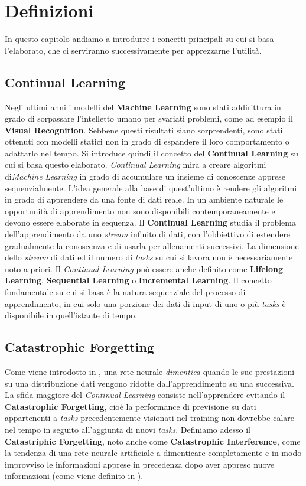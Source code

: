 \chapter{Definizioni}\label{ch:chapter1}
In questo capitolo andiamo a introdurre i concetti principali su cui si basa l'elaborato, che ci serviranno successivamente per apprezzarne l'utilità. 
\section{Continual Learning}
Negli ultimi anni i modelli del \textbf{Machine Learning} sono stati addirittura in grado di sorpassare l'intelletto umano per svariati problemi, come ad esempio il \textbf{Visual Recognition}.
Sebbene questi risultati siano sorprendenti, sono stati ottenuti con modelli statici non in grado di espandere il loro comportamento o adattarlo nel tempo. Si introduce quindi il concetto del \textbf{Continual Learning} su cui si basa questo elaborato.\newline
\textit{Continual Learning} mira a creare algoritmi di\textit{Machine Learning} in grado di accumulare un insieme di conoscenze apprese sequenzialmente. L'idea generale alla base di quest'ultimo è rendere gli algoritmi in grado di apprendere da una fonte di dati reale. In un ambiente naturale le opportunità di apprendimento non sono disponibili contemporaneamente e devono essere elaborate in sequenza.\newline
Il \textbf{Continual Learning} studia il problema dell'apprendimento da uno \textit{stream} infinito di dati, con l'obbiettivo di estendere gradualmente la conoscenza e di usarla per allenamenti successivi. La dimensione dello \textit{stream} di dati ed il numero di \textit{tasks} su cui si lavora non è necessariamente noto a priori.  Il \textit{Continual Learning} può essere anche definito come \textbf{Lifelong Learning}, \textbf{Sequential Learning} o \textbf{Incremental Learning}.
Il concetto fondamentale su cui si basa  è la natura sequenziale del processo di apprendimento, in cui solo una porzione dei dati di input di uno o più \textit{tasks} è disponibile in quell'istante di tempo.
\section{Catastrophic Forgetting}
Come viene introdotto in \cite{Continual_Learning}, una rete neurale \textit{dimentica} quando le sue prestazioni su una distribuzione dati vengono ridotte dall'apprendimento su una successiva.
La sfida maggiore del \textit{Continual Learning} consiste nell'apprendere evitando il  \textbf{Catastrophic Forgetting}, cioè la performance di previsione su dati appartenenti a \textit{tasks} precedentemente visionati nel training non dovrebbe calare nel tempo in seguito all'aggiunta di nuovi \textit{tasks}.
Definiamo adesso il \textbf{Catastriphic Forgetting}, noto anche come \textbf{Catastrophic Interference}, come la tendenza di una rete neurale artificiale a dimenticare completamente e in modo improvviso le informazioni apprese in precedenza dopo aver appreso nuove informazioni (come viene definito in \cite{Continual_Learning}).
